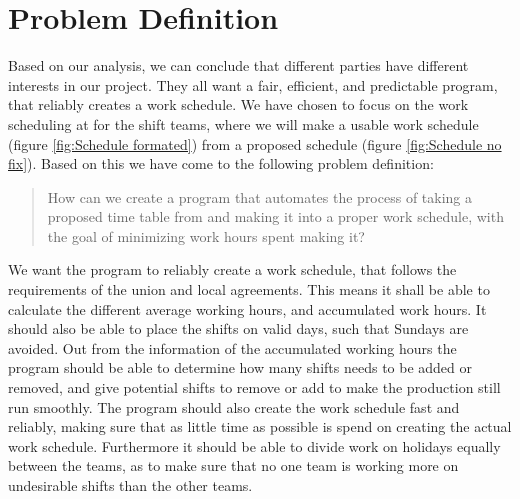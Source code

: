 \section{Problem Definition}

Based on our analysis, we can conclude that different parties have different interests in our project. They all want a fair, efficient, and predictable program, that reliably creates a work schedule. We have chosen to focus on the work scheduling at \siemens for the shift teams, where we will make a usable work schedule (figure \ref{fig:Schedule formated}) from a proposed schedule (figure \ref{fig:Schedule no fix}). Based on this we have come to the following problem definition:

\begin{quote}
    How can we create a program that automates the process of taking a proposed time table  from \siemens and making it into a proper work schedule, with the goal of minimizing work hours spent making it?
\end{quote}

We want the program to reliably create a work schedule, that follows the requirements of the union and local agreements. This means it shall be able to calculate the different average working hours, and accumulated work hours. It should also be able to place the shifts on valid days, such that Sundays are avoided. Out from the information of the accumulated working hours the program should be able to determine how many shifts needs to be added or removed, and give potential shifts to remove or add to make the production still run smoothly. The program should also create the work schedule fast and reliably, making sure that as little time as possible is spend on creating the actual work schedule. Furthermore it should be able to divide work on holidays equally between the teams, as to make sure that no one team is working more on undesirable shifts than the other teams.

